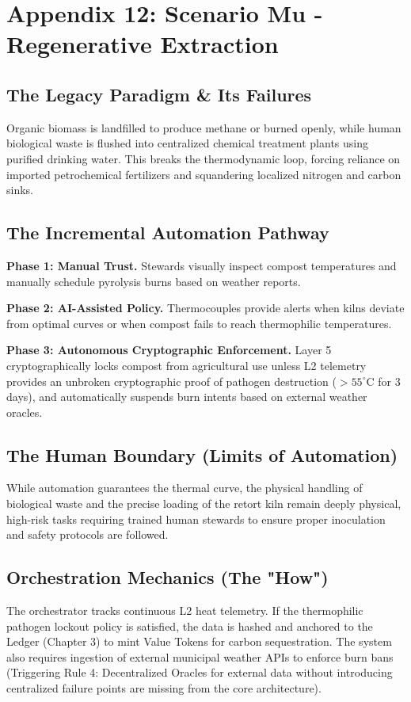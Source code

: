 \chapter{Appendix 12: Scenario Mu - Regenerative Extraction}

\section{The Legacy Paradigm \& Its Failures}
Organic biomass is landfilled to produce methane or burned openly, while human biological waste is flushed into centralized chemical treatment plants using purified drinking water. This breaks the thermodynamic loop, forcing reliance on imported petrochemical fertilizers and squandering localized nitrogen and carbon sinks.

\section{The Incremental Automation Pathway}
\textbf{Phase 1: Manual Trust.} Stewards visually inspect compost temperatures and manually schedule pyrolysis burns based on weather reports.

\textbf{Phase 2: AI-Assisted Policy.} Thermocouples provide alerts when kilns deviate from optimal curves or when compost fails to reach thermophilic temperatures.

\textbf{Phase 3: Autonomous Cryptographic Enforcement.} Layer 5 cryptographically locks compost from agricultural use unless L2 telemetry provides an unbroken cryptographic proof of pathogen destruction ($>55^\circ\text{C}$ for 3 days), and automatically suspends burn intents based on external weather oracles.

\section{The Human Boundary (Limits of Automation)}
While automation guarantees the thermal curve, the physical handling of biological waste and the precise loading of the retort kiln remain deeply physical, high-risk tasks requiring trained human stewards to ensure proper inoculation and safety protocols are followed.

\section{Orchestration Mechanics (The "How")}
The orchestrator tracks continuous L2 heat telemetry. If the thermophilic pathogen lockout policy is satisfied, the data is hashed and anchored to the Ledger (Chapter 3) to mint Value Tokens for carbon sequestration. The system also requires ingestion of external municipal weather APIs to enforce burn bans (Triggering Rule 4: Decentralized Oracles for external data without introducing centralized failure points are missing from the core architecture).

